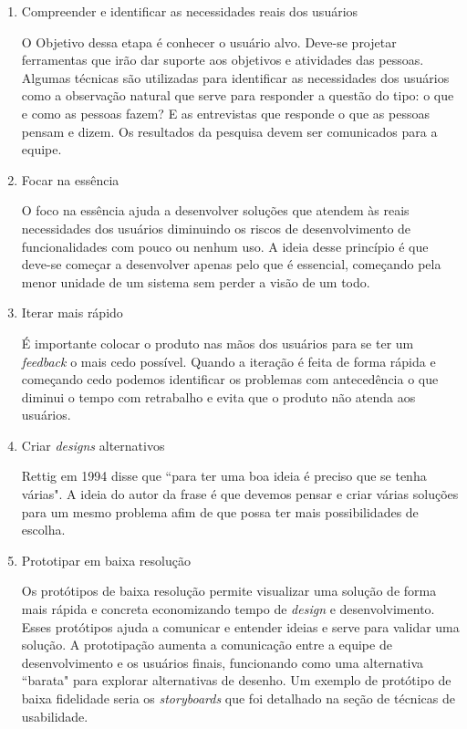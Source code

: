 \begin{enumerate}

\item Compreender e identificar as necessidades reais dos usuários

O Objetivo dessa etapa é conhecer o usuário alvo. Deve-se projetar ferramentas que irão dar suporte aos objetivos e atividades das pessoas.
%
Algumas técnicas são utilizadas para identificar as necessidades dos usuários como a observação natural que serve para responder a questão do tipo: o que e como as pessoas fazem? E as entrevistas que responde o que as pessoas pensam e dizem. Os resultados da pesquisa devem ser comunicados para a equipe.

\item Focar na essência

O foco na essência ajuda a desenvolver soluções que atendem às reais necessidades dos usuários diminuindo os riscos de desenvolvimento de funcionalidades com pouco ou nenhum uso.
%
A ideia desse princípio é que deve-se começar a desenvolver apenas pelo que é essencial, começando pela menor unidade de um sistema sem perder a visão de um todo.

\item Iterar mais rápido

	É importante colocar o produto nas mãos dos usuários para se ter um \textit{feedback} o mais cedo possível. Quando a iteração é feita de forma rápida e começando cedo podemos identificar os problemas com antecedência o que diminui o tempo com retrabalho e evita que o produto não atenda aos usuários.
	

\item Criar \emph{designs} alternativos

	Rettig em 1994 disse que ``para ter uma boa ideia é preciso que se tenha várias". A ideia do autor da frase é que devemos pensar e criar várias soluções para um mesmo problema afim de que possa ter mais possibilidades de escolha. 


\item Prototipar em baixa resolução

Os protótipos de baixa resolução permite visualizar uma solução de forma mais rápida e concreta economizando tempo de \emph{design} e desenvolvimento. Esses protótipos ajuda a comunicar e entender ideias e serve para validar uma solução. 
%
A prototipação aumenta a comunicação entre a equipe de desenvolvimento e os usuários finais, funcionando como uma alternativa ``barata" para explorar alternativas de desenho. Um exemplo de protótipo de baixa fidelidade seria os \emph{storyboards} que foi detalhado na seção de técnicas de usabilidade.
	

\end{enumerate}
